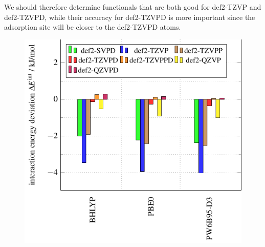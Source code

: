 We should therefore determine functionals that are both good for def2-TZVP and def2-TZVPD,
while their accuracy for def2-TZVPD is more important since the adsorption site will
be closer to the def2-TZVPD atoms. 
\begin{figure}[b!]
\centering
% 
% 
% 
\includegraphics[width=.7\textwidth]{TikzPics/TikzCreation/Bench/BenchH2O+H2O.BasisCompare.pdf}

\end{figure}
